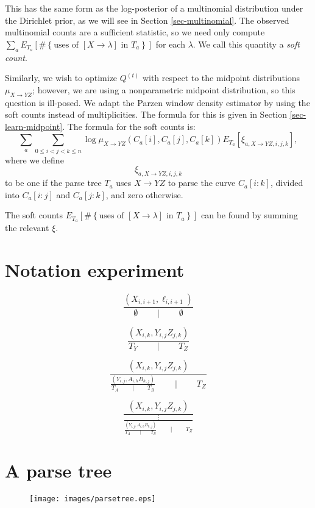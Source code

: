 \documentclass{article}
\begin{document}
This has the same form as the log-posterior of a multinomial
distribution under the Dirichlet prior, as we will see in Section
\ref{sec-multinomial}. The observed multinomial counts are a
sufficient statistic, so we need only compute $\sum_a E_{T_a}\left[
  \#\left\{\mbox{uses of }[X\to \lambda] \mbox{ in } T_a
  \right\}\right]$ for each $\lambda$. We call this quantity a
\emph{soft count}.

Similarly, we wish to optimize $Q^{(t)}$ with respect to the midpoint
distributions $\mu_{X\to YZ}$; however, we are using a nonparametric
midpoint distribution, so this question is ill-posed. We adapt the
Parzen window density estimator by using the soft counts instead of
multiplicities. The formula for this is given in Section
\ref{sec-learn-midpoint}.  The formula for the soft counts is:
$$\sum_a \sum_{0\le i < j < k\le n} \log \mu_{X\to YZ}(C_a[i], C_a[j], C_a[k])
 E_{T_a}\left[ \xi_{a, X\to YZ, i,j,k} \right],$$
where we define
$$\xi_{a, X\to YZ,i,j,k}$$
to be one if the parse tree $T_a$ uses $X\to YZ$ to parse the curve
$C_a[i:k]$, divided into $C_a[i:j]$ and $C_a[j:k]$, and zero otherwise.

The soft counts $E_{T_a}\left[ \#\left\{\mbox{uses of
    }[X\to \lambda] \mbox{ in } T_a\right\}\right]$ can be found by summing the
relevant $\xi$.



\section{Notation experiment}

$$\frac{(X_{i,i+1}, \ell_{i,i+1})}{\emptyset \qquad \mid \qquad \emptyset}$$

$$\frac{(X_{i,k}, Y_{i,j} Z_{j,k})}{T_{Y} \qquad \mid \qquad T_Z}$$

$$\frac{(X_{i,k}, Y_{i,j} Z_{j,k})}{
\frac{(Y_{i,j}, A_{i,h}B_{h,j})}{T_A \qquad\mid \qquad T_B}
\qquad \mid \qquad T_Z}$$

$$\frac{(X_{i,k}, Y_{i,j} Z_{j,k})}{
\frac{\vdots}{
\frac{(Y_{i,j}, A_{i,h}B_{h,j})}{T_A \qquad\mid \qquad T_B}
\qquad \mid \qquad T_Z}}$$


\section{A parse tree}

\begin{figure}
\texttt{[image: images/parsetree.eps]}
\end{figure}
\end{document}
